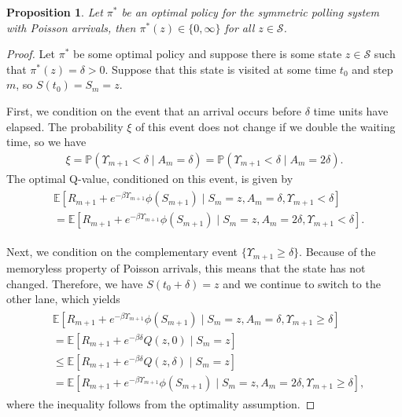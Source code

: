 \documentclass{article}
\theoremstyle{definition}
\theoremstyle{plain}
\newtheorem{proposition}{Proposition}[section]
\begin{document}
\begin{proposition}
  Let $\pi^{*}$ be an optimal policy for the symmetric polling system with
  Poisson arrivals, then $\pi^{*}(z) \in \{0, \infty\}$ for all $z \in \mathcal{S}$.
\end{proposition}
\begin{proof}
  Let $\pi^{*}$ be some optimal policy and suppose there is some state
  $z \in \mathcal{S}$ such that $\pi^{*}(z) = \delta > 0$. Suppose that this
  state is visited at some time $t_{0}$ and step $m$, so $S(t_{0}) = S_{m} = z$.

  First, we condition on the event that an arrival occurs before $\delta$ time
  units have elapsed. The probability $\xi$ of this event does not change if we
  double the waiting time, so we have
  \begin{align}
    \xi = \mathbb{P}(\Upsilon_{m+1} < \delta \; | \; A_{m} = \delta) =
    \mathbb{P}(\Upsilon_{m+1} < \delta \; | \; A_{m} = 2 \delta) .
  \end{align}
  The optimal Q-value, conditioned on this event, is given by
  \begin{align}
    \label{eq:event_arrival}
    \begin{split}
    & \mathbb{E}\left[ R_{m+1} + e^{-\beta \Upsilon_{m+1}} \phi(S_{m+1}) \; | \; S_{m} = z, A_{m} = \delta, \Upsilon_{m+1} < \delta \right] \\
    &= \mathbb{E}\left[ R_{m+1} + e^{-\beta \Upsilon_{m+1}} \phi(S_{m+1}) \; | \; S_{m} = z, A_{m} = 2 \delta, \Upsilon_{m+1} < \delta \right] .
    \end{split}
  \end{align}

  Next, we condition on the complementary event
  $\{ \Upsilon_{m+1} \geq \delta \}$. Because of the memoryless property of
  Poisson arrivals, this means that the state has not changed. Therefore, we
  have $S(t_{0} + \delta) = z$ and we continue to switch to the other lane,
  which yields
  \begin{align}
    \label{eq:event_no_arrival}
    \begin{split}
    & \mathbb{E}\left[ R_{m+1} + e^{-\beta \Upsilon_{m+1}} \phi(S_{m+1}) \; | \; S_{m} = z, A_{m} = \delta, \Upsilon_{m+1} \geq \delta \right] \\
    &= \mathbb{E}\left[ R_{m+1} + e^{-\beta \delta} Q(z, 0) \; | \; S_{m} = z \right] \\
    &\leq \mathbb{E}\left[ R_{m+1} + e^{-\beta \delta} Q(z, \delta) \; | \; S_{m} = z \right] \\
    &= \mathbb{E}\left[ R_{m+1} + e^{-\beta \Upsilon_{m+1}} \phi(S_{m+1}) \; | \; S_{m} = z, A_{m} = 2 \delta, \Upsilon_{m+1} \geq \delta \right] ,
    \end{split}
  \end{align}
  where the inequality follows from the optimality assumption.


\end{proof}
\end{document}
